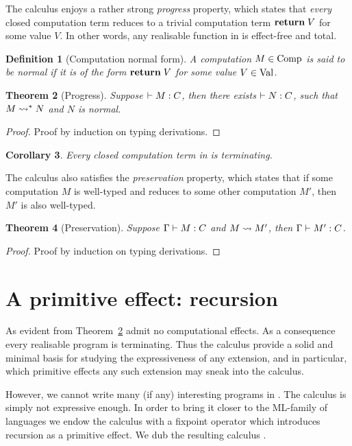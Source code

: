 \documentclass[12pt,phd,lfcs,twoside,openright,logo,leftchapter,normalheadings]{infthesis}
\theoremstyle{plain}
\newtheorem{theorem}{Theorem}[chapter]
\newtheorem{corollary}[theorem]{Corollary}
\newtheorem{definition}[theorem]{Definition}
\theoremstyle{definition}
\begin{document}
%
The calculus enjoys a rather strong \emph{progress} property, which
states that \emph{every} closed computation term reduces to a trivial
computation term $\mathbf{return}\;V$ for some value $V$. In other words, any
realisable function in \BCalc{} is effect-free and total.
%
\begin{definition}[Computation normal form]\label{def:base-language-comp-normal}
  A computation $M \in \textrm{Comp}$ is said to be \emph{normal} if it is
  of the form $\mathbf{return}\; V$ for some value $V \in \textrm{Val}$.
\end{definition}
%
\begin{theorem}[Progress]\label{thm:base-language-progress}
  Suppose $\vdash M : C$, then there exists $\vdash N : C$, such
  that $M \leadsto^\ast N$ and $N$ is normal.
\end{theorem}
%
\begin{proof}
  Proof by induction on typing derivations.
\end{proof}
%
\begin{corollary}
  Every closed computation term in \BCalc{} is terminating.
\end{corollary}
%
The calculus also satisfies the \emph{preservation} property,
which states that if some computation $M$ is well-typed and reduces to
some other computation $M'$, then $M'$ is also well-typed.
%
\begin{theorem}[Preservation]\label{thm:base-language-preservation}
  Suppose $\Gamma \vdash M : C$ and $M \leadsto M'$, then
  $\Gamma \vdash M' : C$.
\end{theorem}
%
\begin{proof}
  Proof by induction on typing derivations.
\end{proof}

\section{A primitive effect: recursion}
\label{sec:base-language-recursion}
%
As evident from Theorem~\ref{thm:base-language-progress} \BCalc{}
admit no computational effects. As a consequence every realisable
program is terminating. Thus the calculus provide a solid and minimal
basis for studying the expressiveness of any extension, and in
particular, which primitive effects any such extension may sneak into
the calculus.

However, we cannot write many (if any) interesting programs in
\BCalc{}. The calculus is simply not expressive enough. In order to
bring it closer to the ML-family of languages we endow the calculus
with a fixpoint operator which introduces recursion as a primitive
effect. We dub the resulting calculus \BCalcRec{}.
%
\end{document}
